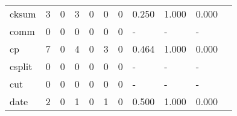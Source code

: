\begin{longtable}{lp{1.2cm}p{1.2cm}p{1.2cm}p{1.2cm}p{1.2cm}p{1.2cm}p{1.2cm}p{1.2cm}p{1.2cm}p{1.2cm}}
cksum     &                                     3 &                                                  0 &                                                3 &                                               0 &                                                0 &                                              0 &                                              0.250 &                                              1.000 &                                              0.000 \\
comm      &                                     0 &                                                  0 &                                                0 &                                               0 &                                                0 &                                              0 &                                                  - &                                                  - &                                                  - \\
cp        &                                     7 &                                                  0 &                                                4 &                                               0 &                                                3 &                                              0 &                                              0.464 &                                              1.000 &                                              0.000 \\
csplit    &                                     0 &                                                  0 &                                                0 &                                               0 &                                                0 &                                              0 &                                                  - &                                                  - &                                                  - \\
cut       &                                     0 &                                                  0 &                                                0 &                                               0 &                                                0 &                                              0 &                                                  - &                                                  - &                                                  - \\
date      &                                     2 &                                                  0 &                                                1 &                                               0 &                                                1 &                                              0 &                                              0.500 &                                              1.000 &                                              0.000 \\

\end{longtable}
